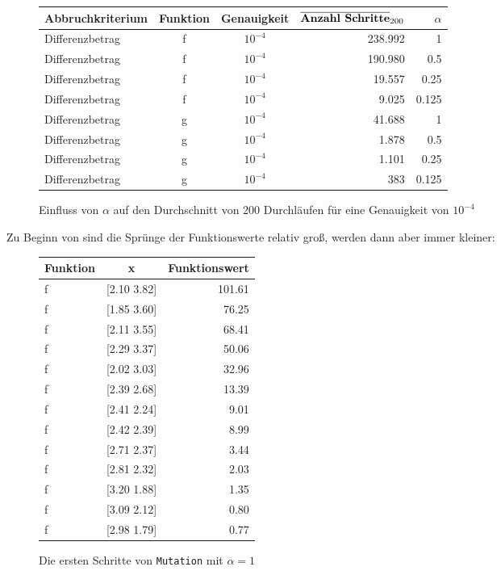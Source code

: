 \documentclass[a4paper, 12pt]{report}
\begin{document}
\begin{figure}[H]
  \centering
  \def\arraystretch{1.25}
  \begin{tabular}{l|c|c|r|r}
    \hline
    \textbf{Abbruchkriterium} & \textbf{Funktion} & \textbf{Genauigkeit} & $\overline{ \text{\textbf{Anzahl Schritte}} }_{200}$ & \textbf{$\alpha$}\\
    \hline
    Differenzbetrag & f & $10^{-4} $ & 238.992 & 1\\
    Differenzbetrag & f & $10^{-4} $ & 190.980 & 0.5\\
    Differenzbetrag & f & $10^{-4} $ & 19.557 & 0.25\\
    Differenzbetrag & f & $10^{-4} $ & 9.025 & 0.125\\
    Differenzbetrag & g & $10^{-4} $ & 41.688 & 1\\
    Differenzbetrag & g & $10^{-4} $ & 1.878 & 0.5\\
    Differenzbetrag & g & $10^{-4} $ & 1.101 & 0.25\\
    Differenzbetrag & g & $10^{-4} $ & 383 & 0.125\\
    \hline
  \end{tabular}
  \caption{Einfluss von $\alpha$ auf den Durchschnitt von 200 Durchläufen für eine Genauigkeit von $10^{-4}$}
\end{figure}

Zu Beginn von sind die Sprünge der Funktionswerte relativ groß, werden dann aber immer kleiner:

\begin{figure}[H]
  \centering
  \def\arraystretch{1.25}
  \begin{tabular}{l|c|r}
    \hline
    \textbf{Funktion} & \textbf{x} & \textbf{Funktionswert}\\
    \hline
    f & [2.10 3.82] & 101.61\\
    f & [1.85 3.60] & 76.25\\
    f & [2.11 3.55] & 68.41\\
    f & [2.29 3.37] & 50.06\\
    f & [2.02 3.03] & 32.96\\
    f & [2.39 2.68] & 13.39\\
    f & [2.41 2.24] & 9.01\\
    f & [2.42 2.39] & 8.99\\
    f & [2.71 2.37] & 3.44\\
    f & [2.81 2.32] & 2.03\\
    f & [3.20 1.88] & 1.35\\
    f & [3.09 2.12] & 0.80\\
    f & [2.98 1.79] & 0.77\\
    \hline
  \end{tabular}
  \caption{Die ersten Schritte von \lstinline[basicstyle=\ttfamily\color{black}]|Mutation| mit $\alpha = 1$}
\end{figure}
\end{document}

